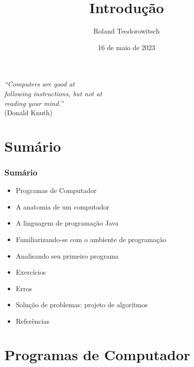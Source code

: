 \documentclass[aspectratio=169]{beamer}
\title[\sc{Introdução}]{Introdução}
\author[Roland Teodorowitsch]{Roland Teodorowitsch}
\institute[FPROG - EP - PUCRS]{Fundamentos de Programação - Escola Politécnica - PUCRS}
\date{16 de maio de 2023}
\begin{document}
\justifying

\begin{frame}
	\titlepage
\end{frame}

\begin{frame}
\vspace{5cm}
\begin{flushright}
\emph{``Computers are good at\\
following instructions, but not at\\
reading your mind.''}\\
(Donald Knuth)
\end{flushright}
\end{frame}

\section{Sumário}

\begin{frame}\frametitle{Sumário}
\begin{itemize}
	\item Programas de Computador
	\item A anatomia de um computador
	\item A linguagem de programação Java
	\item Familiarizando-se com o ambiente de programação
	\item Analisando seu primeiro programa
	\item Exercícios
	\item Erros
	\item Solução de problemas: projeto de algoritmos
	\item Referências
\end{itemize}
\end{frame}


\section{Programas de Computador}
\end{document}
